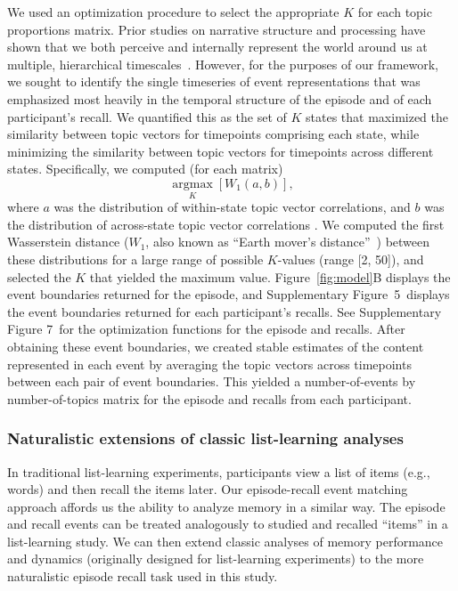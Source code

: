 \documentclass[10pt]{article}
\newcommand{\argmax}{\mathop{\mathrm{argmax}}\limits}
\newcommand{\corrmats}{5}
\newcommand{\kopt}{7}
\begin{document}
We used an optimization procedure to select the appropriate $K$ for each topic proportions matrix.  Prior studies on narrative structure and processing have shown that we both perceive and internally represent the world around us at multiple, hierarchical timescales~\citep{HassEtal08, LernEtal11, HassEtal15, ChenEtal17, BaldEtal17, BaldEtal18}.  However, for the purposes of our framework, we sought to identify the single timeseries of event representations that was emphasized most heavily in the temporal structure of the episode and of each participant's recall.  We quantified this as the set of $K$ states that maximized the similarity between topic vectors for timepoints comprising each state, while minimizing the similarity between topic vectors for timepoints across different states.  Specifically, we computed (for each matrix)
\[
  \argmax_K \left[W_{1}(a, b)\right],
\]
where $a$ was the distribution of within-state topic vector correlations, and $b$ was the distribution of across-state topic vector correlations .  We computed the first Wasserstein distance ($W_{1}$, also known as ``Earth mover's distance''~\citep{Dobr70, RamdEtal17}) between these distributions for a large range of possible $K$-values (range [2, 50]), and selected the $K$ that yielded the maximum value.  Figure~\ref{fig:model}B displays the event boundaries returned for the episode, and Supplementary Figure~\corrmats~displays the event boundaries returned for each participant's recalls.  See Supplementary Figure \kopt~for the optimization functions for the episode and recalls.  After obtaining these event boundaries, we created stable estimates of the content represented in each event by averaging the topic vectors across timepoints between each pair of event boundaries.  This yielded a number-of-events by number-of-topics matrix for the episode and recalls from each participant.

\subsubsection*{Naturalistic extensions of classic list-learning analyses}
In traditional list-learning experiments, participants view a list of items (e.g., words) and then recall the items later.  Our episode-recall event matching approach affords us the ability to analyze memory in a similar way. The episode and recall events can be treated analogously to studied and recalled ``items'' in a list-learning study.  We can then extend classic analyses of memory performance and dynamics (originally designed for list-learning experiments) to the more naturalistic episode recall task used in this study.
\end{document}
